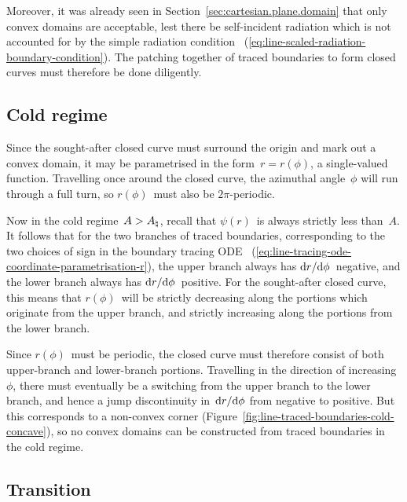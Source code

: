 Moreover, it was already seen in Section~\ref{sec:cartesian.plane.domain}
that only convex domains are acceptable,
lest there be self-incident radiation which is not accounted for
by the simple radiation condition~%
  (\ref{eq:line-scaled-radiation-boundary-condition}).
The patching together of traced boundaries to form closed curves
must therefore be done diligently.

\subsection{Cold regime}
\label{sec:polar.tracing.cold}

Since the sought-after closed curve must surround the origin
and mark out a convex domain,
it may be parametrised in the form~$r = r (\phi)$,
a single-valued function.
Travelling once around the closed curve,
the azimuthal angle~$\phi$ will run through a full turn,
so $r (\phi)$~must also be $2 \pi$-periodic.

Now in the cold regime~$A > A_\natural$,
recall that $\psi (r)$~is always strictly less than~$A$.
It follows that for the two branches of traced boundaries,
corresponding to the two choices of sign in the boundary tracing ODE~%
  (\ref{eq:line-tracing-ode-coordinate-parametrisation-r}),
the upper branch always has $\mathop{}\!\mathrm{d} r / {\mathop{}\!\mathrm{d}\phi}$~negative,
and the lower branch always has $\mathop{}\!\mathrm{d} r / {\mathop{}\!\mathrm{d}\phi}$~positive.
For the sought-after closed curve,
this means that $r (\phi)$~will be strictly decreasing
along the portions which originate from the upper branch,
and strictly increasing along the portions from the lower branch.

\begin{figure}
\end{figure}

Since $r (\phi)$~must be periodic,
the closed curve must therefore consist of both
upper-branch and lower-branch portions.
Travelling in the direction of increasing~$\phi$,
there must eventually be a switching
from the upper branch to the lower branch,
and hence a jump discontinuity in~$\mathop{}\!\mathrm{d} r / {\mathop{}\!\mathrm{d}\phi}$
from negative to positive.
But this corresponds to a non-convex corner
(Figure~\ref{fig:line-traced-boundaries-cold-concave}),
so no convex domains can be constructed from traced boundaries
in the cold regime.

\subsection{Transition}
\label{sec:polar.tracing.transition}

